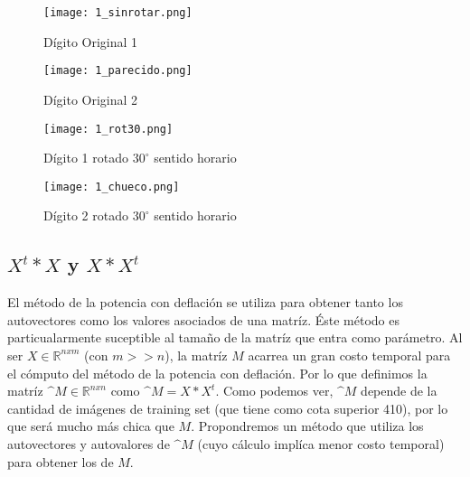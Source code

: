 \begin{figure}[ht] 
  \begin{minipage}[b]{0.5\linewidth}
    \centering
    \texttt{[image: 1\_sinrotar.png]} 
    \caption{Dígito Original 1} 
    \vspace{4ex}
  \end{minipage}%
  \begin{minipage}[b]{0.5\linewidth}
    \centering
    \texttt{[image: 1\_parecido.png]} 
    \caption{Dígito Original 2} 
    \vspace{4ex}
  \end{minipage} 
  \begin{minipage}[b]{0.5\linewidth}
    \centering
    \texttt{[image: 1\_rot30.png]} 
    \caption{Dígito 1 rotado $30^\circ$ sentido horario} 
    \vspace{4ex}
  \end{minipage}%
  \begin{minipage}[b]{0.5\linewidth}
    \centering
    \texttt{[image: 1\_chueco.png]} 
    \caption{Dígito 2 rotado $30^\circ$ sentido horario} 
    \vspace{4ex}
  \end{minipage} 
\end{figure}


\subsection{$X^t*X$ y $X*X^t$}
El método de la potencia con deflación se utiliza para obtener tanto los autovectores como los valores asociados de una matríz. Éste método es particualarmente suceptible al tamaño de la matríz que entra como parámetro. Al ser $X\in\mathbb{R}^{nxm}$ (con $m >> n$), la matríz $M$ acarrea un gran costo temporal para el cómputo del método de la potencia con deflación. Por lo que definimos la matríz $\^{M}\in\mathbb{R}^{nxn}$ como $\^{M}=X*X^t$. Como podemos ver, $\^{M}$ depende de la cantidad de imágenes de training set (que tiene como cota superior 410), por lo que será mucho más chica que $M$. Propondremos un método que utiliza los autovectores y autovalores de $\^{M}$ (cuyo cálculo implíca menor costo temporal) para obtener los de $M$.

